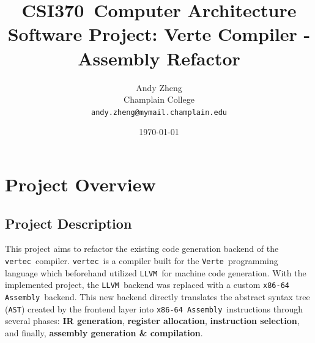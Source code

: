 \documentclass[11pt]{article}
\makeatletter
\newcommand{\coursecode}{CSI370}
\newcommand{\coursetitle}{Computer Architecture}
\newcommand{\assignmenttitle}{Software Project: Verte Compiler - Assembly Refactor}
\newcommand{\authorname}{Andy Zheng}
\newcommand{\authoremail}{andy.zheng@mymail.champlain.edu}
\newcommand{\institution}{Champlain College}
\newcommand{\constant}[1]{\texttt{#1}}
\newcommand{\verte}{\texttt{Verte}}
\newcommand{\vertec}{\texttt{vertec}}
\newcommand{\llvm}{\texttt{LLVM}}
\newcommand{\asm}{\texttt{x86-64 Assembly}}
\makeatother
\begin{document}
\title{\coursecode\ \coursetitle \\ \vspace{0.5em} \Large \assignmenttitle}

\author{
	\authorname \\
	\small \institution \\
	\small \texttt{\authoremail}
}

\date{\today}

\maketitle
\thispagestyle{plain}

\section{Project Overview}

\subsection{Project Description}

This project aims to refactor the existing code generation backend of the \vertec\ compiler. \vertec\ is a compiler built for the \verte\ programming language which beforehand utilized \llvm\ for machine code generation. With the implemented project, the \llvm\ backend was replaced with a custom \asm\ backend. This new backend directly translates the abstract syntax tree (\constant{AST}) created by the frontend layer into \asm\ instructions through several phases: \textbf{IR generation}, \textbf{register allocation}, \textbf{instruction selection}, and finally, \textbf{assembly generation \& compilation}.
\end{document}
